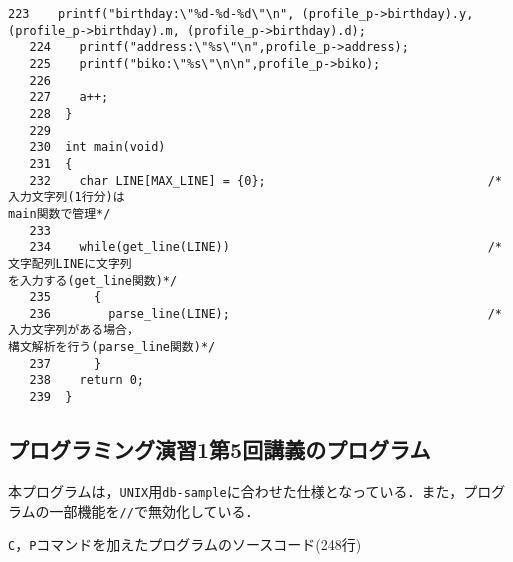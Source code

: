 \begin{Verbatim}[fontsize=\small, baselinestretch=0.8]
   223	  printf("birthday:\"%d-%d-%d\"\n", (profile_p->birthday).y, 
(profile_p->birthday).m, (profile_p->birthday).d);
   224	  printf("address:\"%s\"\n",profile_p->address);
   225	  printf("biko:\"%s\"\n\n",profile_p->biko);
   226	
   227	  a++;
   228	}
   229	
   230	int main(void)
   231	{
   232	  char LINE[MAX_LINE] = {0};                               /*入力文字列(1行分)は
main関数で管理*/
   233	
   234	  while(get_line(LINE))                                    /*文字配列LINEに文字列
を入力する(get_line関数)*/
   235	    {
   236	      parse_line(LINE);                                    /*入力文字列がある場合，
構文解析を行う(parse_line関数)*/
   237	    }
   238	  return 0;
   239	}

\end{Verbatim}

\subsection{プログラミング演習1第5回講義のプログラム}\label{func5}

本プログラムは，\verb|UNIX|用\verb|db-sample|に合わせた仕様となっている．また，プログラムの一部機能を\verb|//|で無効化している．

\verb|C|，\verb|P|コマンドを加えたプログラムのソースコード(248行)

